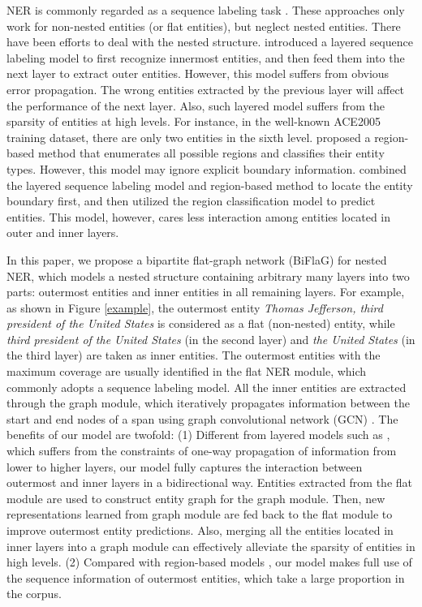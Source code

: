 \documentclass[11pt,a4paper]{article}
\begin{document}
NER is commonly regarded as a sequence labeling task \cite{lample2016neural,ma2016end,peters2017semi}. These approaches only work for non-nested entities (or flat entities), but neglect nested entities. There have been efforts to deal with the nested structure.
\citeauthor{ju2018neural} \citeyear{ju2018neural} introduced a layered sequence labeling model to first recognize innermost entities, and then feed them into the next layer to extract outer entities. However, this model suffers from obvious error propagation. The wrong entities extracted by the previous layer will affect the performance of the next layer. Also, such layered model suffers from the sparsity of entities at high levels. For instance, in the well-known ACE2005 training dataset, there are only two entities in the sixth level.
\citeauthor{sohrab2018deep} \citeyear{sohrab2018deep} proposed a region-based method that enumerates
all possible regions and classifies their entity types. However, this model may ignore explicit boundary information.
\citeauthor{zheng2019boundary} \citeyear{zheng2019boundary}  combined the layered sequence labeling model and region-based method to locate the entity boundary first, and then utilized the region classification model to predict entities. This model, however, cares less interaction among entities located in outer and inner layers. 

In this paper, we propose a bipartite flat-graph network (BiFlaG) for nested NER, which models a nested structure containing arbitrary many layers into two parts: outermost entities and inner entities in all remaining layers.
For example, as shown in Figure \ref{example}, the outermost entity \textit{Thomas Jefferson, third president of the United States} is considered as a flat (non-nested) entity, while \textit{third president of the United States} (in the second layer)  and \textit{the United States} (in the third layer) are taken as inner entities. 
The outermost entities with the maximum coverage are usually identified in the flat NER module, which commonly adopts a sequence labeling model. 
All the inner entities are extracted through the graph module, which iteratively propagates information between the start and end nodes of a span using graph convolutional network (GCN) \cite{kipf2016semi}.
The benefits of our model are twofold:
(1) Different from layered models such as \cite{ju2018neural}, which suffers from the constraints of one-way propagation of information from lower to higher layers, our model fully captures the interaction between outermost and inner layers in a bidirectional way. Entities extracted from the flat module are used to construct entity graph for the graph module.
Then, new representations learned from graph module are fed back to the flat module to  improve  outermost entity predictions.
Also, merging all the entities located in inner layers into a graph module can effectively alleviate the sparsity of entities in high levels.
(2) Compared with region-based models \cite{sohrab2018deep,zheng2019boundary}, our model makes full use of the sequence information of outermost entities, which take a large proportion in the corpus.
\end{document}

